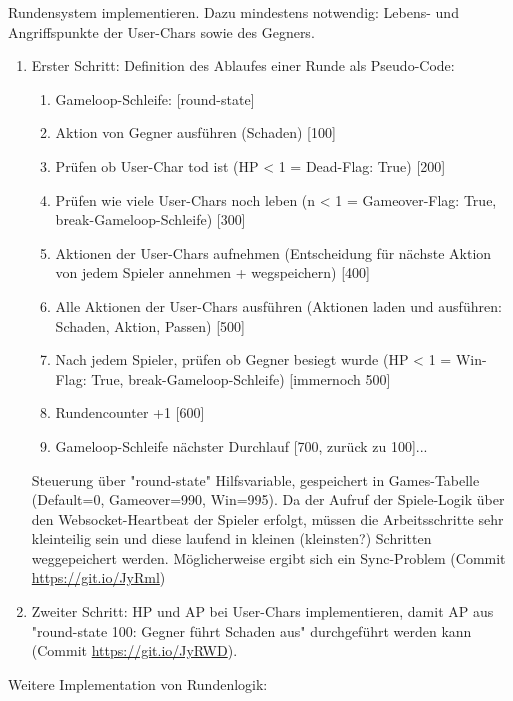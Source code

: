 Rundensystem implementieren. Dazu mindestens notwendig: Lebens- und Angriffspunkte der User-Chars sowie des Gegners. 
    \begin{enumerate}
        \item Erster Schritt: Definition des Ablaufes einer Runde als Pseudo-Code: 
            \begin{enumerate}
                \item Gameloop-Schleife: [round-state]
                \item Aktion von Gegner ausführen (Schaden) [100]
                \item Prüfen ob User-Char tod ist (HP < 1 = Dead-Flag: True) [200]
                \item Prüfen wie viele User-Chars noch leben (n < 1 = Gameover-Flag: True, break-Gameloop-Schleife) [300]
                \item Aktionen der User-Chars aufnehmen (Entscheidung für nächste Aktion von jedem Spieler annehmen + wegspeichern) [400]
                \item Alle Aktionen der User-Chars ausführen (Aktionen laden und ausführen: Schaden, Aktion, Passen) [500]
                \item Nach jedem Spieler, prüfen ob Gegner besiegt wurde (HP < 1 = Win-Flag: True, break-Gameloop-Schleife) [immernoch 500]
                \item Rundencounter +1 [600]
                \item Gameloop-Schleife nächster Durchlauf [700, zurück zu 100]...
            \end{enumerate}
    Steuerung über "round-state" Hilfsvariable, gespeichert in Games-Tabelle (Default=0, Gameover=990, Win=995). Da der Aufruf der Spiele-Logik über den Websocket-Heartbeat der Spieler erfolgt, müssen die Arbeitsschritte sehr kleinteilig sein und diese laufend in kleinen (kleinsten?) Schritten weggepeichert werden. Möglicherweise ergibt sich ein Sync-Problem (Commit \url{https://git.io/JyRml})
    \item Zweiter Schritt: HP und AP bei User-Chars implementieren, damit AP aus "round-state 100: Gegner führt Schaden aus" durchgeführt werden kann (Commit \url{https://git.io/JyRWD}).  
    \end{enumerate}








    Weitere Implementation von Rundenlogik:

